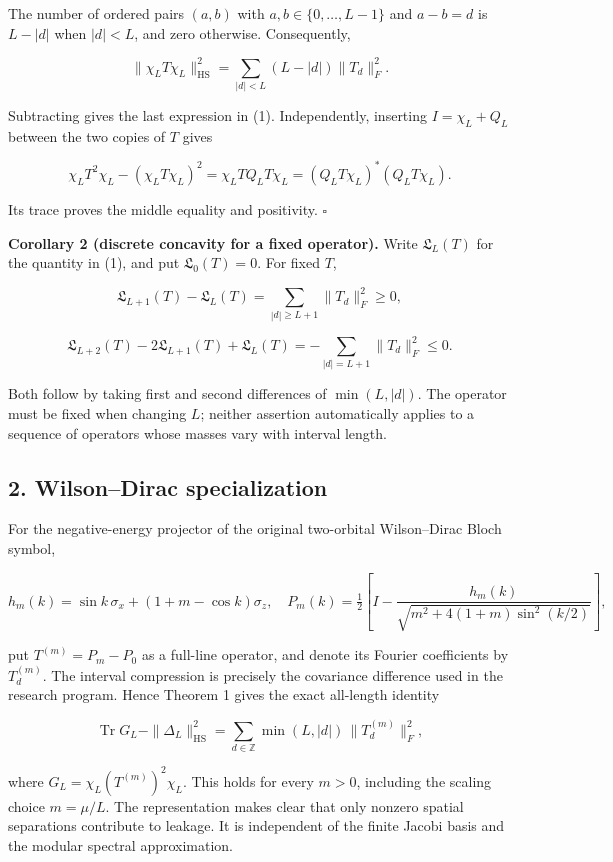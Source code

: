\documentclass[
  10pt,
  a4paper,
]{article}
\begin{document}
The number of ordered pairs \((a,b)\) with \(a,b\in\{0,\ldots,L-1\}\) and \(a-b=d\) is \(L-|d|\) when \(|d|<L\), and zero otherwise. Consequently,

\[
\|\chi_LT\chi_L\|_{\mathrm{HS}}^2
=\sum_{|d|<L}(L-|d|)\|T_d\|_F^2.
\]

Subtracting gives the last expression in (1). Independently, inserting \(I=\chi_L+Q_L\) between the two copies of \(T\) gives

\[
\chi_LT^2\chi_L-(\chi_LT\chi_L)^2=\chi_LTQ_LT\chi_L
=(Q_LT\chi_L)^*(Q_LT\chi_L).
\]

Its trace proves the middle equality and positivity. \(\square\)

\textbf{Corollary 2 (discrete concavity for a fixed operator).} Write \(\mathfrak L_L(T)\) for the quantity in (1), and put \(\mathfrak L_0(T)=0\). For fixed \(T\),

\[
\boxed{\mathfrak L_{L+1}(T)-\mathfrak L_L(T)
=\sum_{|d|\ge L+1}\|T_d\|_F^2\ge0,}
\tag{2}
\]

\[
\boxed{\mathfrak L_{L+2}(T)-2\mathfrak L_{L+1}(T)+\mathfrak L_L(T)
=-\sum_{|d|=L+1}\|T_d\|_F^2\le0.}
\tag{3}
\]

Both follow by taking first and second differences of \(\min(L,|d|)\). The operator must be fixed when changing \(L\); neither assertion automatically applies to a sequence of operators whose masses vary with interval length.

\subsection{2. Wilson--Dirac specialization}\label{wilsondirac-specialization}

For the negative-energy projector of the original two-orbital Wilson--Dirac Bloch symbol,

\[
h_m(k)=\sin k\,\sigma_x+(1+m-\cos k)\sigma_z,
\quad P_m(k)=\tfrac12\left[I-\frac{h_m(k)}{\sqrt{m^2+4(1+m)\sin^2(k/2)}}\right],
\]

put \(T^{(m)}=P_m-P_0\) as a full-line operator, and denote its Fourier coefficients by \(T_d^{(m)}\). The interval compression is precisely the covariance difference used in the research program. Hence Theorem 1 gives the exact all-length identity

\[
\boxed{\operatorname{Tr}G_L-\|\Delta_L\|_{\mathrm{HS}}^2
=\sum_{d\in\mathbb Z}\min(L,|d|)\,\|T_d^{(m)}\|_F^2,}
\tag{4}
\]

where \(G_L=\chi_L(T^{(m)})^2\chi_L\). This holds for every \(m>0\), including the scaling choice \(m=\mu/L\). The representation makes clear that only nonzero spatial separations contribute to leakage. It is independent of the finite Jacobi basis and the modular spectral approximation.
\end{document}
